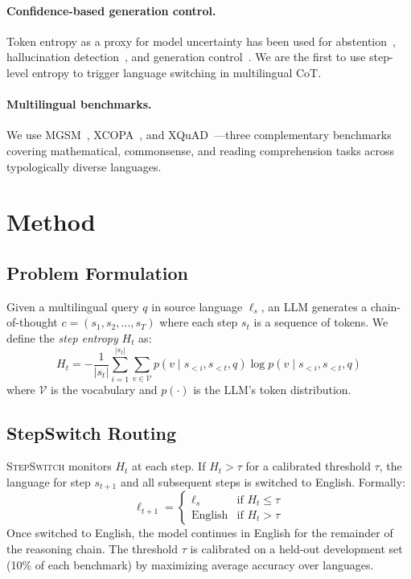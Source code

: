 \documentclass{article}
\newcommand{\stepswitch}{\textsc{StepSwitch}}
\begin{document}
\paragraph{Confidence-based generation control.} Token entropy as a proxy for model uncertainty has been used for abstention~\citep{kadavath2022language}, hallucination detection~\citep{manakul2023selfcheckgpt}, and generation control~\citep{malinin2021uncertainty}. We are the first to use step-level entropy to trigger language switching in multilingual CoT.

\paragraph{Multilingual benchmarks.} We use MGSM~\citep{shi2022language}, XCOPA~\citep{ponti2020xcopa}, and XQuAD~\citep{artetxe2020cross}---three complementary benchmarks covering mathematical, commonsense, and reading comprehension tasks across typologically diverse languages.

\section{Method}
\label{sec:method}

\subsection{Problem Formulation}
Given a multilingual query $q$ in source language $\ell_s$, an LLM generates a chain-of-thought $c = (s_1, s_2, \ldots, s_T)$ where each step $s_t$ is a sequence of tokens. We define the \emph{step entropy} $H_t$ as:
\begin{equation}
    H_t = -\frac{1}{|s_t|} \sum_{i=1}^{|s_t|} \sum_{v \in \mathcal{V}} p(v \mid s_{<i}, s_{<t}, q) \log p(v \mid s_{<i}, s_{<t}, q)
\end{equation}
where $\mathcal{V}$ is the vocabulary and $p(\cdot)$ is the LLM's token distribution.

\subsection{StepSwitch Routing}
\stepswitch{} monitors $H_t$ at each step. If $H_t > \tau$ for a calibrated threshold $\tau$, the language for step $s_{t+1}$ and all subsequent steps is switched to English. Formally:
\begin{equation}
    \ell_{t+1} = \begin{cases} \ell_s & \text{if } H_t \leq \tau \\ \text{English} & \text{if } H_t > \tau \end{cases}
\end{equation}
Once switched to English, the model continues in English for the remainder of the reasoning chain. The threshold $\tau$ is calibrated on a held-out development set (10\% of each benchmark) by maximizing average accuracy over languages.
\end{document}
